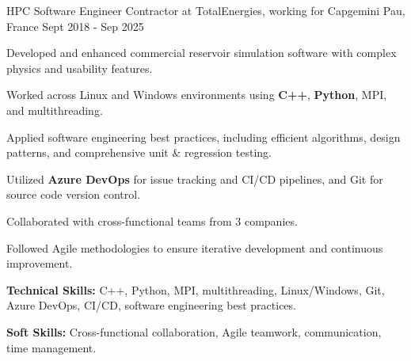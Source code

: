 

\begin{cventries}

  \cventry
    {HPC Software Engineer} %
    {Contractor at TotalEnergies, working for Capgemini} %
    {Pau, France} %
    {Sept 2018 - Sep 2025} %
    {
      \begin{cvitems} %
        \item {Developed and enhanced commercial reservoir simulation software with complex physics and usability features.}
        \item {Worked across Linux and Windows environments using \textbf{C++}, \textbf{Python}, MPI, and multithreading.}
        \item {Applied software engineering best practices, including efficient algorithms, design patterns, and comprehensive unit \& regression testing.}
        \item {Utilized \textbf{Azure DevOps} for issue tracking and CI/CD pipelines, and Git for source code version control.}
        \item {Collaborated with cross-functional teams from 3 companies.}
        \item {Followed Agile methodologies to ensure iterative development and continuous improvement.}
        \item {\textbf{Technical Skills:} C++, Python, MPI, multithreading, Linux/Windows, Git, Azure DevOps, CI/CD, software engineering best practices.}
        \item {\textbf{Soft Skills:} Cross-functional collaboration, Agile teamwork, communication, time management.}
      \end{cvitems}
    }


\end{cventries}
